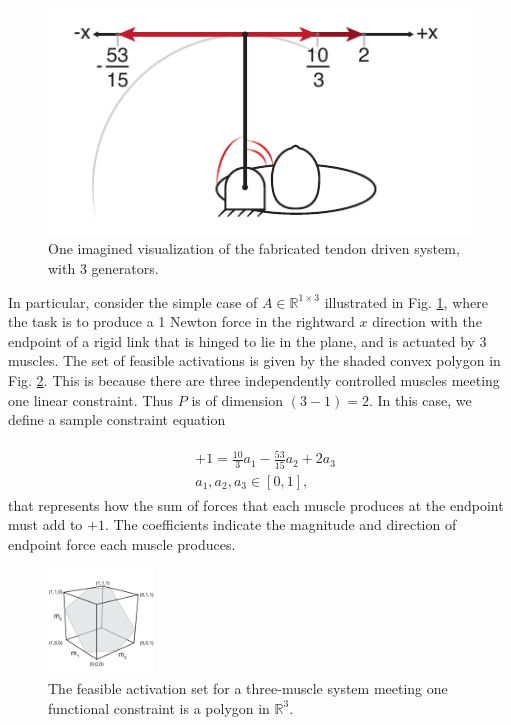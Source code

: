 \begin{figure}[h]
  \label{fig:schematic_arm}
  \centering
  \includegraphics{figs/schematic_arm_1D.pdf}
  \caption{One imagined visualization of the fabricated tendon driven system, with 3 generators.}
\end{figure}
In particular, consider the simple case of $A  \in \mathbb{R}^{1 \times 3}$  illustrated in Fig. \ref{fig:schematic_arm}, where the task is to produce a 1 Newton force in the rightward $x$ direction with the endpoint of a rigid link that is hinged to lie in the plane, and is actuated by 3 muscles.
The set of feasible activations is given by the shaded convex polygon in Fig. \ref{fig:polygon_slice_solution_space}. This is because there are three independently controlled muscles meeting one linear   constraint. Thus $P$ is of dimension $(3-1) = 2$. In this case, we define a sample constraint equation 

\begin{align}
\label{eq:constraint}
\begin{split}
	&+1 = \frac{10}{3}a_1 - \frac{53}{15}a_2 + 2a_3 \\
&a_1, a_2, a_3 \in [0,1],
\end{split}
\end{align}
that represents how the sum of forces that each muscle produces at the endpoint must add to $+1$. The coefficients indicate the magnitude and direction of endpoint force each muscle produces.


\begin{figure}[t]
  \label{fig:polygon_slice_solution_space}
  \centering
  \includegraphics[width=0.25\textwidth]{sections/figs/feasibleactivation.png}
  \caption{The feasible activation set for a  three-muscle system meeting one functional constraint is a polygon in $\mathbb{R}^3$.} %
\end{figure}

